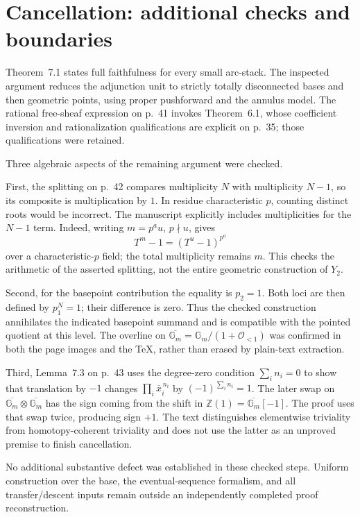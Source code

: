 \documentclass[10pt]{article}
\begin{document}
\section*{Cancellation: additional checks and boundaries}
Theorem 7.1 states full faithfulness for every small arc-stack. The inspected argument reduces the adjunction unit to strictly totally disconnected bases and then geometric points, using proper pushforward and the annulus model. The rational free-sheaf expression on p. 41 invokes Theorem 6.1, whose coefficient inversion and rationalization qualifications are explicit on p. 35; those qualifications were retained.\par
Three algebraic aspects of the remaining argument were checked.\par
First, the splitting on p. 42 compares multiplicity \(N\) with multiplicity \(N-1\), so its composite is multiplication by \(1\). In residue characteristic \(p\), counting distinct roots would be incorrect. The manuscript explicitly includes multiplicities for the \(N-1\) term. Indeed, writing \(m=p^a u\), \(p\nmid u\), gives \[T^m-1=(T^u-1)^{p^a}\] over a characteristic-\(p\) field; the total multiplicity remains \(m\). This checks the arithmetic of the asserted splitting, not the entire geometric construction of \(Y_2\).\par
Second, for the basepoint contribution the equality is \(p_2=1\). Both loci are then defined by \(p_1^N=1\); their difference is zero. Thus the checked construction annihilates the indicated basepoint summand and is compatible with the pointed quotient at this level. The overline on \(\overline{\mathbb G_m}=\mathbb G_m/(1+\mathcal O_{<1})\) was confirmed in both the page images and the TeX, rather than erased by plain-text extraction.\par
Third, Lemma 7.3 on p. 43 uses the degree-zero condition \(\sum_i n_i=0\) to show that translation by \(-1\) changes \(\prod_i\overline{x}_i^{\,n_i}\) by \((-1)^{\sum_i n_i}=1\). The later swap on \(\overline{\mathbb G_m}\otimes\overline{\mathbb G_m}\) has the sign coming from the shift in \(\mathbb Z(1)=\overline{\mathbb G_m}[-1]\). The proof uses that swap twice, producing sign \(+1\). The text distinguishes elementwise triviality from homotopy-coherent triviality and does not use the latter as an unproved premise to finish cancellation.\par
No additional substantive defect was established in these checked steps. Uniform construction over the base, the eventual-sequence formalism, and all transfer/descent inputs remain outside an independently completed proof reconstruction.\par
\end{document}
